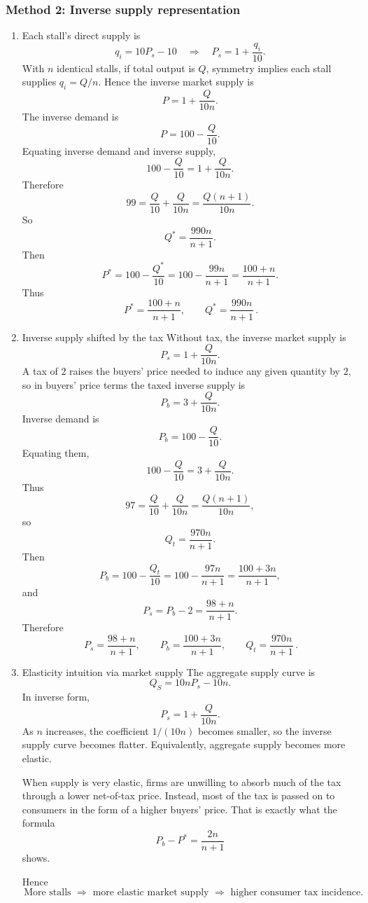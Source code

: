 \documentclass[12pt]{article}
\begin{document}
\newpage
\subsubsection{Method 2: Inverse supply representation}
\begin{enumerate}[label=(\alph*)]
    \item Each stall's direct supply is
\[
q_i=10P_s-10
\quad\Longrightarrow\quad
P_s=1+\frac{q_i}{10}.
\]
With \(n\) identical stalls, if total output is \(Q\), symmetry implies each stall supplies \(q_i=Q/n\). Hence the inverse market supply is
\[
P=1+\frac{Q}{10n}.
\]
The inverse demand is
\[
P=100-\frac{Q}{10}.
\]
Equating inverse demand and inverse supply,
\[
100-\frac{Q}{10}=1+\frac{Q}{10n}.
\]
Therefore
\[
99=\frac{Q}{10}+\frac{Q}{10n}
=\frac{Q(n+1)}{10n}.
\]
So
\[
Q^*=\frac{990n}{n+1}.
\]
Then
\[
P^*=100-\frac{Q^*}{10}
=100-\frac{99n}{n+1}
=\frac{100+n}{n+1}.
\]
Thus
\[
\boxed{\,P^*=\frac{100+n}{n+1},\qquad Q^*=\frac{990n}{n+1}\,.}
\]


    \item Inverse supply shifted by the tax
Without tax, the inverse market supply is
\[
P_s=1+\frac{Q}{10n}.
\]
A tax of \(2\) raises the buyers' price needed to induce any given quantity by \(2\), so in buyers' price terms the taxed inverse supply is
\[
P_b=3+\frac{Q}{10n}.
\]
Inverse demand is
\[
P_b=100-\frac{Q}{10}.
\]
Equating them,
\[
100-\frac{Q}{10}=3+\frac{Q}{10n}.
\]
Thus
\[
97=\frac{Q}{10}+\frac{Q}{10n}
=\frac{Q(n+1)}{10n},
\]
so
\[
Q_t=\frac{970n}{n+1}.
\]
Then
\[
P_b=100-\frac{Q_t}{10}
=100-\frac{97n}{n+1}
=\frac{100+3n}{n+1},
\]
and
\[
P_s=P_b-2=\frac{98+n}{n+1}.
\]
Therefore
\[
\boxed{\,P_s=\frac{98+n}{n+1},\qquad P_b=\frac{100+3n}{n+1},\qquad Q_t=\frac{970n}{n+1}\,.}
\]


    \item Elasticity intuition via market supply
The aggregate supply curve is
\[
Q_S=10nP_s-10n.
\]
In inverse form,
\[
P_s=1+\frac{Q}{10n}.
\]
As \(n\) increases, the coefficient \(1/(10n)\) becomes smaller, so the inverse supply curve becomes flatter. Equivalently, aggregate supply becomes more elastic.

When supply is very elastic, firms are unwilling to absorb much of the tax through a lower net-of-tax price. Instead, most of the tax is passed on to consumers in the form of a higher buyers' price. That is exactly what the formula
\[
P_b-P^*=\frac{2n}{n+1}
\]
shows.

Hence
\[
\boxed{\,\text{More stalls } \Rightarrow \text{ more elastic market supply } \Rightarrow \text{ higher consumer tax incidence.}\,}
\]

\end{enumerate}
\end{document}
